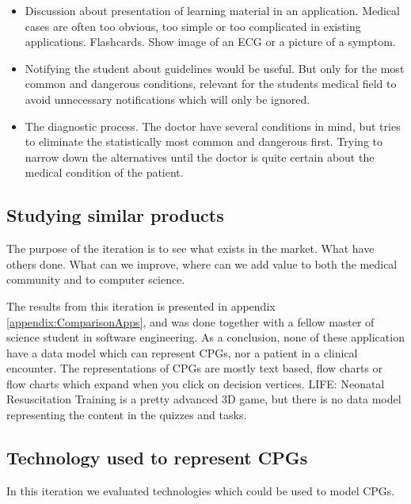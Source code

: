 \begin{itemize}
	\item Discussion about presentation of learning material in an application. Medical cases are often too obvious, too simple or too complicated in existing applications. Flashcards. Show image of an ECG or a picture of a symptom.
	\item Notifying the student about guidelines would be useful. But only for the most common and dangerous conditions, relevant for the students medical field to avoid unnecessary notifications which will only be ignored.
	\item The diagnostic process. The doctor have several conditions in mind, but tries to eliminate the statistically most common and dangerous first. Trying to narrow down the alternatives until the doctor is quite certain about the medical condition of the patient.
	
\end{itemize}

\subsection{Studying similar products}
The purpose of the iteration is to see what exists in the market. What have others done. What can we improve, where can we add value to both the medical community and to computer science.

The results from this iteration is presented in appendix \ref{appendix:ComparisonApps}, and was done together with a fellow master of science student in software engineering. As a conclusion, none of these application have a data model which can represent CPGs, nor a patient in a clinical encounter. The representations of CPGs are mostly text based, flow charts or flow charts which expand when you click on decision vertices. LIFE: Neonatal Resuscitation Training is a pretty advanced 3D game, but there is no data model representing the content in the quizzes and tasks.

\subsection{Technology used to represent CPGs}
In this iteration we evaluated technologies which could be used to model CPGs.


